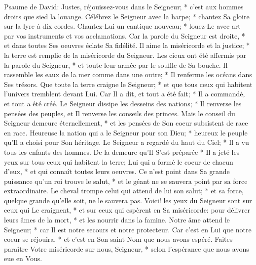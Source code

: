 Psaume de David: Justes, réjouissez-vous dans le Seigneur; * c'est aux hommes droits que sied la louange.
Célébrez le Seigneur avec la harpe; * chantez Sa gloire sur la lyre à dix cordes.
Chantez-Lui un cantique nouveau; * louez-Le avec art par vos instruments et vos acclamations.
Car la parole du Seigneur est droite, * et dans toutes Ses oeuvres éclate Sa fidélité.
Il aime la miséricorde et la justice; * la terre est remplie de la miséricorde du Seigneur.
Les cieux ont été affermis par la parole du Seigneur, * et toute leur armée par le souffle de Sa bouche.
Il rassemble les eaux de la mer comme dans une outre; * Il renferme les océans dans Ses trésors.
Que toute la terre craigne le Seigneur; * et que tous ceux qui habitent l'univers tremblent devant Lui.
Car Il a dit, et tout a été fait; * Il a commandé, et tout a été créé.
Le Seigneur dissipe les desseins des nations; * Il renverse les pensées des peuples, et Il renverse les conseils des princes.
Mais le conseil du Seigneur demeure éternellement, * et les pensées de Son coeur subsistent de race en race.
Heureuse la nation qui a le Seigneur pour son Dieu; * heureux le peuple qu'Il a choisi pour Son héritage.
Le Seigneur a regardé du haut du Ciel; * Il a vu tous les enfants des hommes.
De la demeure qu'Il S'est préparée * Il a jeté les yeux sur tous ceux qui habitent la terre;
Lui qui a formé le coeur de chacun d'eux, * et qui connaît toutes leurs oeuvres.
Ce n'est point dans Sa grande puissance qu'un roi trouve le salut, * et le géant ne se sauvera point par sa force extraordinaire.
Le cheval trompe celui qui attend de lui son salut; * et sa force, quelque grande qu'elle soit, ne le sauvera pas.
Voici! les yeux du Seigneur sont sur ceux qui Le craignent, * et sur ceux qui espèrent en Sa miséricorde:
pour délivrer leurs âmes de la mort, * et les nourrir dans la famine.
Notre âme attend le Seigneur; * car Il est notre secours et notre protecteur.
Car c'est en Lui que notre coeur se réjouira, * et c'est en Son saint Nom que nous avons espéré.
Faites paraître Votre miséricorde sur nous, Seigneur, * selon l'espérance que nous avons eue en Vous.

